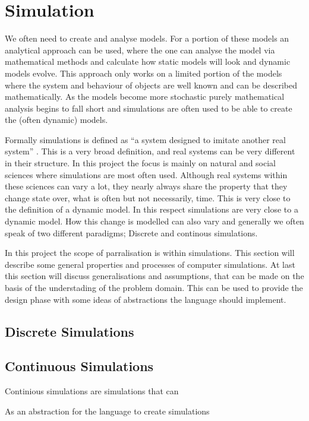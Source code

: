 \section{Simulation}
We often need to create and analyse models. For a portion of these models an analytical approach can be used, where the one can analyse the model via mathematical methods and calculate how static models will look and dynamic models evolve. This approach only works on a limited portion of the models where the system and behaviour of objects are well known and can be described mathematically. As the models become more stochastic purely mathematical analysis begins to fall short and simulations are often used to be able to create the (often dynamic) models.

Formally simulations is defined as \enquote{a system designed to imitate another real system} . This is a very broad definition, and real systems can be very different in their structure. In this project the focus is mainly on natural and social sciences where simulations are most often used. Although real systems within these sciences can vary a lot, they nearly always share the property that they change state over, what is often but not necessarily, time. This is very close to the definition of a dynamic model. In this respect simulations are very close to a dynamic model.
How this change is modelled can also vary and generally we often speak of two different paradigms; Discrete and continous simulations.

In this project the scope of parralisation is within simulations. This section will describe some general properties and processes of computer simulations. At last this section will discuss generalisations and assumptions, that can be made on the basis of the understading of the problem domain. This can be used to provide the design phase with some ideas of abstractions the language should implement.

\subsection{Discrete Simulations}


\subsection{Continuous Simulations}
Continious simulations are simulations that can 

\label{simulationchoise}
As an abstraction for the language to create simulations

